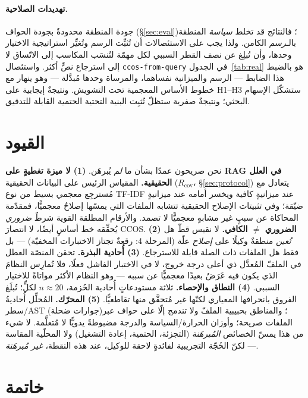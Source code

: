 \documentclass[11pt]{article}
\newcommand{\code}[1]{\textenglish{\texttt{#1}}}
\begin{document}
\paragraph{تهديدات الصلاحية.} جودة المنطقة محدودةٌ بجودة الحواف (\S\ref{sec:eval})؛ فالنتائج
قد تخلط \emph{سياسة} المنطقة بالـ\emph{رسم} الكامن. ولذا يجب على الاستئصالات أن تُثبِّت الرسم
وتُغيِّر استراتيجية الاختيار وحدها، وأن تُبلِغ عن نصف القطر السببي لكل مهمّة لتُنسَب المكاسب
إلى الاتّساق لا إلى استرجاع نصٍّ أكثر. واستئصال \code{ccos-from-query} في الجدول~\ref{tab:real}
هو بالضبط هذا الضابط --- الرسم والميزانية نفساهما، والمرساة وحدها مُبدَّلة --- وهو ينهار مع
خطوط الأساس المعجمية تحت التشويش. ونتيجةٌ إيجابية على H1--H3 ستشكّل الإسهام البحثي؛ ونتيجةٌ
صفرية ستظلّ تُثبِت البنية التحتية الحتمية القابلة للتدقيق.

\section{القيود}

نحن صريحون عمدًا بشأن ما \emph{لم} يُبرهَن.
\textbf{(1) لا ميزة تغطيةٍ على RAG في العلل الحقيقية.} المقياس الرئيس على البيانات الحقيقية
($R_{\mathrm{cov}}$، \S\ref{sec:protocol}) يتعادل مع مُسترجِع معجمي بسيط من نوع TF-IDF عند
ميزانيةٍ كافية ويخسر أمامه عند ميزانيةٍ ضيّقة؛ وفي تثبيتات الإصلاح الحقيقية تتشابه الملفات
التي يمسّها إصلاحٌ معجميًّا، فمقدّمة المحاكاة عن سببٍ غير مشابهٍ معجميًّا لا تصمد. والأرقام
المطلقة القوية شرطٌ \emph{ضروري} يُحقِّقه خط أساسٍ أيضًا، لا انتصارَ CCOS.
\textbf{(2) الضروري $\neq$ الكافي.} لا نقيس قطّ هل \emph{تُعين} منطقةٌ وكيلًا على \emph{إصلاح}
علّة (المرحلة 4: رقعةٌ تجتاز الاختبارات المخفيّة) --- بل فقط هل الملفات ذات الصلة قابلة
للاسترجاع.
\textbf{(3) أُحادية البذرة.} تحقن المنصّة العطل في الملفّ المُعدَّل ذي أعلى درجة خروج، لا في
الاختبار الفاشل فعلًا، فلا تُمارِس النظامَ الذي يكون فيه عَرَضٌ بعيدًا معجميًّا عن سببه --- وهو
النظام الأكثر مواتاةً للاختيار السببي.
\textbf{(4) النطاق والإحصاء.} ثلاثة مستودعاتٍ أُحادية الحُزمة، $n\!\approx\!20$ لكلٍّ؛ تُبلَغ
الفروق بانحرافها المعياري لكنّها غير مُتحقَّق منها تقاطعيًّا.
\textbf{(5) المحرّك.} المُحلِّل أُحاديةُ سطر/AST (جوارات ضحلة)؛ والمناطق بحبيبية الملفّ ولا
تندمج إلّا على حواف عبر الملفات صريحة؛ وأوزان الحرارة/السياسة والدرجة مضبوطةٌ يدويًّا لا
مُتعلَّمة. لا شيء من هذا يمسّ الخصائص \emph{المُبرهَنة} (التجزئة، الحتمية، إعادة التشغيل) ولا
المحلّية المقاسة --- لكنّ الحُجّة التجريبية لفائدةٍ لاحقة للوكيل، عند هذه النقطة، \emph{غير
مُبرهَنة}.

\section{خاتمة}
\end{document}
